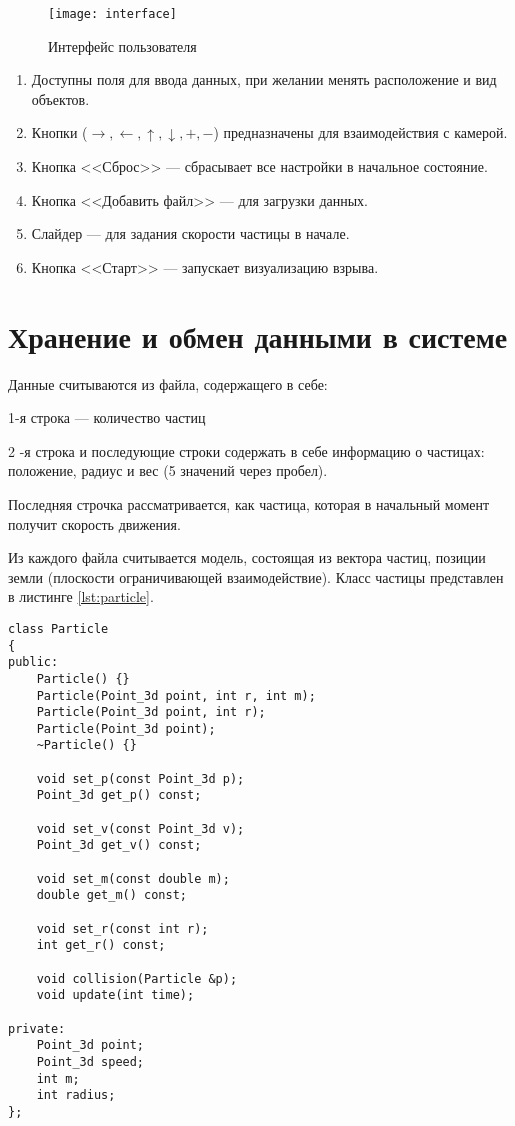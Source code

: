 \begin{figure}[H]
	\centering
	\texttt{[image: interface]}
	\caption{Интерфейс пользователя}
	\label{img:interface}
\end{figure}

\begin{enumerate}
	\item Доступны поля для ввода данных, при желании менять расположение и вид объектов. 
	\item Кнопки ($\to, \leftarrow, \uparrow, \downarrow, +, -$) предназначены для взаимодействия с камерой. 
	\item Кнопка  <<Сброс>> --- сбрасывает все настройки в начальное состояние. 
	\item Кнопка <<Добавить файл>> --- для загрузки данных. 
	\item Слайдер --- для задания скорости частицы в начале. 
	\item Кнопка <<Старт>> --- запускает визуализацию взрыва.   
\end{enumerate}

\section{\textbf{Хранение и обмен данными в системе }}

Данные считываются из файла, содержащего в себе:

1-я строка --- количество частиц

2 -я строка и последующие строки содержать в себе информацию о частицах: положение, радиус и вес (5 значений через пробел). 

Последняя строчка рассматривается, как частица, которая в начальный момент получит скорость движения. 

Из каждого файла считывается модель, состоящая из вектора частиц, позиции земли (плоскости ограничивающей взаимодействие). Класс частицы представлен в листинге \ref{lst:particle}. 


\begin{lstlisting}[caption=Класс частицы, label = lst:particle, style=simplecode]
class Particle
{
public:
    Particle() {}
    Particle(Point_3d point, int r, int m);
    Particle(Point_3d point, int r);
    Particle(Point_3d point);
    ~Particle() {}

    void set_p(const Point_3d p);
    Point_3d get_p() const;

    void set_v(const Point_3d v);
    Point_3d get_v() const;

    void set_m(const double m);
    double get_m() const;

    void set_r(const int r);
    int get_r() const;

    void collision(Particle &p);
    void update(int time);

private:
    Point_3d point;
    Point_3d speed;
    int m;
    int radius;
};
\end{lstlisting}

